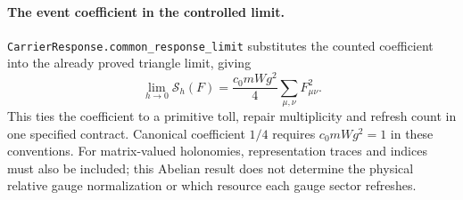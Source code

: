 \paragraph{The event coefficient in the controlled limit.}
\nolinkurl{CarrierResponse.common_response_limit} substitutes the counted coefficient into
the already proved triangle limit, giving
\begin{equation}
 \lim_{h\to0}\mathcal S_h(F)
 =\frac{c_0mWg^2}{4}\sum_{\mu,\nu}F_{\mu\nu}^2.
\end{equation}
This ties the coefficient to a primitive toll, repair multiplicity and refresh count in one
specified contract. Canonical coefficient $1/4$ requires $c_0mWg^2=1$ in these conventions.
For matrix-valued holonomies, representation traces and indices must also be included;
this Abelian result does not determine the physical relative gauge normalization or
which resource each gauge sector refreshes.
